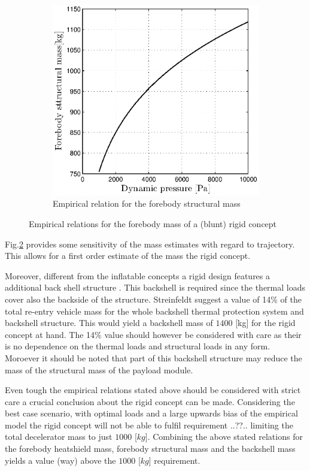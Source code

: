 \begin{figure}[h]
\begin{subfigure}[b]{0.49\textwidth}
	\includegraphics[width=1.0\textwidth]{Figure/rigidstruct.eps}
	\caption{Empirical relation for the forebody structural mass} 
	\label{fig:rigidstruct}
	\end{subfigure}
	\caption{Empirical relations for the forebody mass of a (blunt) rigid concept}
	\label{fig:rigid}
\end{figure}


Fig.\ref{fig:rigid} provides some sensitivity of the mass estimates with regard to trajectory. This allows for a first order estimate of the mass the rigid concept.

Moreover, different from the inflatable concepts a rigid design features a additional back shell structure \cite{Hughes:2005}. This backshell is required since the thermal loads cover also the backside of the structure. Streinfeldt suggest a value of 14\% of the total re-entry vehicle mass for the whole backshell thermal protection system and backshell structure. This would yield a backshell mass of $1400$ [kg] for the rigid concept at hand. The 14\% value should however be considered with care as their is no dependence on the thermal loads and structural loads in any form. Moroever it should be noted that part of this backshell structure may reduce the mass of the structural mass of the payload module.

Even tough the empirical relations stated above should be considered with strict care a crucial conclusion about the rigid concept can be made. Considering the best case scenario, with optimal loads and a large upwards bias of the empirical model the rigid concept will not be able to fulfil requirement ..??.. limiting the total decelerator mass to just $1000$ [$kg$]. Combining the above stated relations for the forebody heatshield mass, forebody structural mass and the backshell mass yields a value (way) above the $1000$ [$kg$] requirement.

